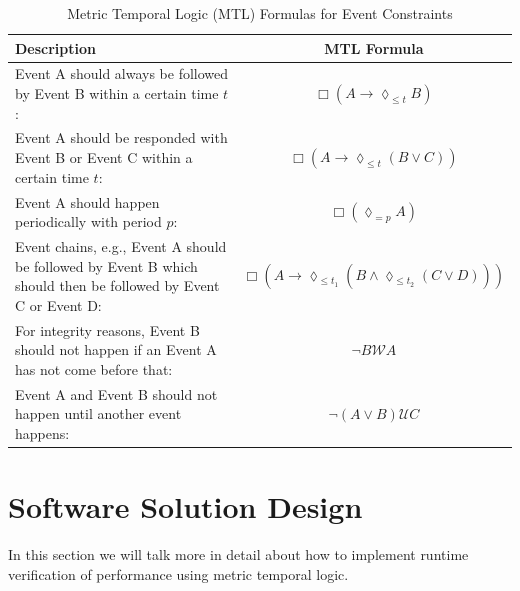 \documentclass[twocolumn]{article}
\begin{document}
\begin{table}[t]
	\centering
	\renewcommand{\arraystretch}{1.5}
	\begin{tabular}{|p{10cm}|c|}
		\hline
		\textbf{Description}                                                                                           & \textbf{MTL Formula} \\
		\hline
		Event A should always be followed by Event B within a certain time \( t \):                                    &
		$\Box (A \rightarrow \lozenge_{\leq t} B)$                                                                                            \\
		\hline
		Event A should be responded with Event B or Event C within a certain time \( t \):                             &
		$\Box (A \rightarrow \lozenge_{\leq t} (B \lor C))$                                                                                   \\
		\hline
		Event A should happen periodically with period \( p \):                                                        &
		$\Box (\lozenge_{= p} A)$                                                                                                             \\
		\hline
		Event chains, e.g., Event A should be followed by Event B which should then be followed by Event C or Event D: &
		$\Box (A \rightarrow \lozenge_{\leq t_1} (B \land \lozenge_{\leq t_2} (C \lor D)))$                                                   \\
		\hline
		For integrity reasons, Event B should not happen if an Event A has not come before that:                       &
		$\neg B \mathcal{W} A$                                                                                                                \\
		\hline
		Event A and Event B should not happen until another event happens:                                             &
		$\neg (A \lor B) \mathcal{U} C$                                                                                                       \\
		\hline
	\end{tabular}
	\caption{Metric Temporal Logic (MTL) Formulas for Event Constraints}
	\label{table:mtl_formulas}
\end{table}


\section{Software Solution Design}
In this section we will talk more in detail about how to implement runtime verification of performance using metric temporal logic.
\end{document}
